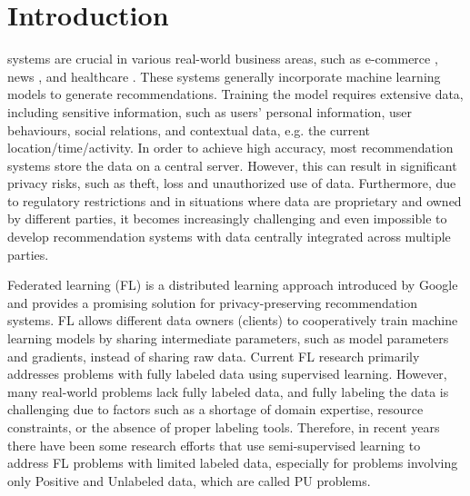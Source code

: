 \documentclass[10pt,journal,compsoc]{IEEEtran}
\begin{document}
\section{Introduction}
 systems are crucial in various real-world business areas, such as e-commerce \cite{sarwar2000analysis,schafer2001commerce}, news \cite{zheng2018drn,liu2010pedersen}, and healthcare \cite{kim2014item,yue2021overview}. These systems generally incorporate machine learning models to generate recommendations. Training the model requires extensive data, including sensitive information, such as users' personal information, user behaviours, social relations, and contextual data, e.g. the current location/time/activity. In order to achieve high accuracy, most recommendation systems store the data on a central server. However, this can result in significant privacy risks, such as theft, loss and unauthorized use of data. Furthermore, due to regulatory restrictions and in situations where data are proprietary and owned by different parties, it becomes increasingly challenging and even impossible to develop recommendation systems with data centrally integrated across multiple parties.

Federated learning (FL) is a distributed learning approach introduced by Google \cite{mcmahan2017communication} and provides a promising solution for privacy-preserving recommendation systems. FL allows different data owners (clients) to cooperatively train machine learning models by sharing intermediate parameters, such as model parameters and gradients, instead of sharing raw data. Current FL research primarily addresses problems with fully labeled data using supervised learning. However, many real-world problems lack fully labeled data, and fully labeling the data is challenging due to factors such as a shortage of domain expertise, resource constraints, or the absence of proper labeling tools. Therefore, in recent years there have been some research efforts that use semi-supervised learning to address FL problems with limited labeled data, especially for problems involving only Positive and Unlabeled data, which are called PU problems.
\end{document}
